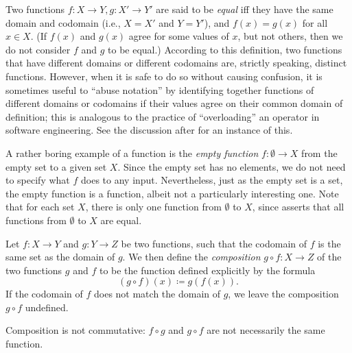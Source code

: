 \begin{defn}\label{i:3.3.7}
  Two functions \(f : X \to Y, g : X' \to Y'\) are said to be \emph{equal} iff they have the same domain and codomain (i.e., \(X = X'\) and \(Y = Y'\)), and \(f(x) = g(x)\) for all \(x \in X\).
  (If \(f(x)\) and \(g(x)\) agree for some values of \(x\), but not others, then we do not consider \(f\) and \(g\) to be equal.)
  According to this definition, two functions that have different domains or different codomains are, strictly speaking, distinct functions.
  However, when it is safe to do so without causing confusion, it is sometimes useful to ``abuse notation'' by identifying together functions of different domains or codomains if their values agree on their common domain of definition;
  this is analogous to the practice of ``overloading'' an operator in software engineering.
  See the discussion after  for an instance of this.
\end{defn}

\setcounter{thm}{8}
\begin{eg}\label{i:3.3.9}
  A rather boring example of a function is the \emph{empty function} \(f : \emptyset \to X\) from the empty set to a given set \(X\).
  Since the empty set has no elements, we do not need to specify what \(f\) does to any input.
  Nevertheless, just as the empty set is a set, the empty function is a function, albeit not a particularly interesting one.
  Note that for each set \(X\), there is only one function from \(\emptyset\) to \(X\), since  asserts that all functions from \(\emptyset\) to \(X\) are equal.
\end{eg}

\begin{defn}[Composition]\label{i:3.3.10}
  Let \(f : X \to Y\) and \(g : Y \to Z\) be two functions, such that the codomain of \(f\) is the same set as the domain of \(g\).
  We then define the \emph{composition} \(g \circ f : X \to Z\) of the two functions \(g\) and \(f\) to be the function defined explicitly by the formula
  \[
    (g \circ f)(x) \coloneqq g(f(x)).
  \]
  If the codomain of \(f\) does not match the domain of \(g\), we leave the composition \(g \circ f\) undefined.
\end{defn}

\begin{note}
  Composition is not commutative:
  \(f \circ g\) and \(g \circ f\) are not necessarily the same function.
\end{note}

